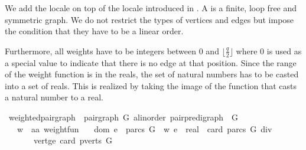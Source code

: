 \begin{isabellebody}
\isadelimproof
%
\endisadelimproof
%
\isatagproof
%
\endisatagproof
{\isafoldproof}%
%
\isadelimproof
%
\endisadelimproof
%
\isadelimdocument
%
\endisadelimdocument
%
\isatagdocument
%
\isamarkuptrue%
%
\endisatagdocument
{\isafolddocument}%
%
\isadelimdocument
%
\endisadelimdocument
%
\begin{isamarkuptext}%
\label{localeSurjective} We add the locale  
on top of the locale  introduced in . A   is a 
finite, loop free and symmetric graph. We do not restrict the types of vertices and edges but impose 
the condition that they have to be a linear order.

 Furthermore, all weights have to be integers between 0 and $\lfloor\frac{q}{2}\rfloor$ where 0 is 
used as a special value to indicate that there is no edge at that position. Since the 
range of the weight function is in the reals, the set of natural numbers
\mbox{} has to be casted into a set of reals. This is realized by taking the image
of the function  that casts a natural number to a real.%
\end{isamarkuptext}\isamarkuptrue%
\isamarkupfalse%
\ weighted{\isacharunderscore}pair{\isacharunderscore}graph\ {\isacharequal}\ pair{\isacharunderscore}graph\ {\isachardoublequoteopen}{\isacharparenleft}G{\isacharcolon}{\isacharcolon}\ {\isacharparenleft}{\isacharprime}a{\isacharcolon}{\isacharcolon}linorder{\isacharparenright}\ pair{\isacharunderscore}pre{\isacharunderscore}digraph{\isacharparenright}{\isachardoublequoteclose}\ \ G\ {\isacharplus}\isanewline
\ \ \ w\ {\isacharcolon}{\isacharcolon}\ {\isachardoublequoteopen}{\isacharparenleft}{\isacharprime}a{\isasymtimes}{\isacharprime}a{\isacharparenright}\ weight{\isacharunderscore}fun{\isachardoublequoteclose}\isanewline
\ \ \ dom{\isacharcolon}\ {\isachardoublequoteopen}e\ {\isasymin}\ parcs\ G\ {\isasymlongrightarrow}\ w\ e\ {\isasymin}\ real\ {\isacharbackquote}\ {\isacharbraceleft}{}{\isachardot}{\isachardot}card\ {\isacharparenleft}parcs\ G{\isacharparenright}\ div\ {}{\isacharbraceright}{\isachardoublequoteclose}\ \isanewline
\ \ \ \ \ \ \ vert{\isacharunderscore}ge{\isacharcolon}\ {\isachardoublequoteopen}card\ {\isacharparenleft}pverts\ G{\isacharparenright}\ {\isasymge}\ {}{\isachardoublequoteclose}\ %

\end{isabellebody}
